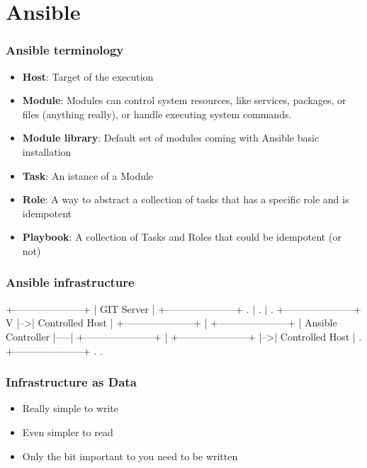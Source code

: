 \documentclass[t,aspectratio=169]{beamer}
\begin{document}
\section{Ansible}
\begin{frame}
    \frametitle{Ansible terminology}
    \begin{itemize}
        \item<2->\textbf{Host}: Target of the execution
        \item<3->\textbf{Module}: Modules can control system resources, like services, packages, or files (anything really), or handle executing system commands.
        \item<4->\textbf{Module library}: Default set of modules coming with Ansible basic installation
        \item<5->\textbf{Task}: An istance of a Module 
        \item<6->\textbf{Role}: A way to abstract a collection of tasks that has a specific role and is idempotent
        \item<7->\textbf{Playbook}: A collection of Tasks and Roles that could be idempotent (or not)
    \end{itemize}
\end{frame}

\begin{frame}[fragile]
    \frametitle{Ansible infrastructure}
    \begin{semiverbatim}
+---------------------+
|     GIT Server      |
+---------------------+     .
           |                .
           |                .   +---------------------+
           V                |-->|   Controlled Host   |
+---------------------+     |   +---------------------+
| Ansible Controller  |-----|
+---------------------+     |   +---------------------+
                            |-->|   Controlled Host   |
                            .   +---------------------+
                            .
                            .
    \end{semiverbatim}
\end{frame}

\begin{frame}
    \frametitle{Infrastructure as Data}
    \begin{itemize}
        \item<2-> Really simple to write
        \item<3-> Even simpler to read
        \item<4-> Only the bit important to you need to be written
    \end{itemize}
\end{frame}
\end{document}
